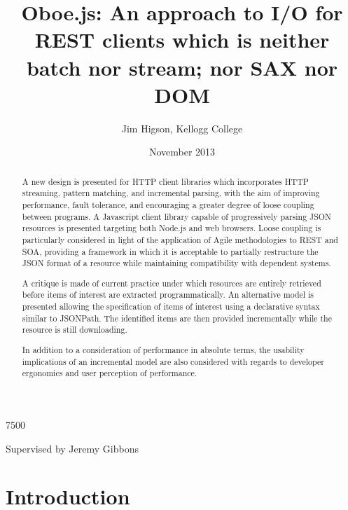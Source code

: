 \documentclass[12pt, ]{article}
\title{Oboe.js: An approach to I/O for REST clients which is neither batch nor
stream; nor SAX nor DOM}
\author{Jim Higson, Kellogg College}
\date{November 2013}
\let\stdsection\section
\renewcommand\section{\newpage\stdsection}
\begin{document}
\raggedbottom
{} 7500
\addtolength{\topskip}{0pt plus 10pt}

\maketitle

\begin{center}
{\large Supervised by Jeremy Gibbons}
\end{center}

\begin{abstract}
A new design is presented for HTTP client libraries which incorporates
HTTP streaming, pattern matching, and incremental parsing, with the aim
of improving performance, fault tolerance, and encouraging a greater
degree of loose coupling between programs. A Javascript client library
capable of progressively parsing JSON resources is presented targeting
both Node.js and web browsers. Loose coupling is particularly considered
in light of the application of Agile methodologies to REST and SOA,
providing a framework in which it is acceptable to partially restructure
the JSON format of a resource while maintaining compatibility with
dependent systems.

A critique is made of current practice under which resources are
entirely retrieved before items of interest are extracted
programmatically. An alternative model is presented allowing the
specification of items of interest using a declarative syntax similar to
JSONPath. The identified items are then provided incrementally while the
resource is still downloading.

In addition to a consideration of performance in absolute terms, the
usability implications of an incremental model are also considered with
regards to developer ergonomics and user perception of performance.
\end{abstract}


{
\clearpage
\hypersetup{linkcolor=black}
\setcounter{tocdepth}{3}
\tableofcontents
}

\clearpage
\listoffigures

\clearpage

\section{Introduction}\label{introduction}
\end{document}

